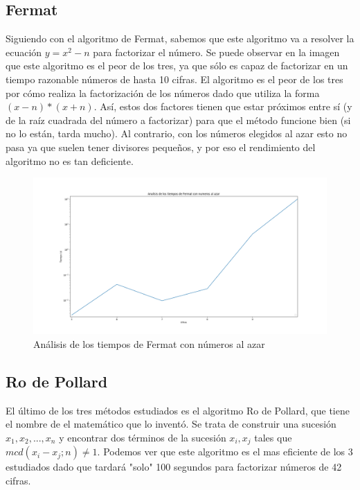 \documentclass{article}
\begin{document}
    \newpage

    \subsection{Fermat}
    Siguiendo con el algoritmo de Fermat, sabemos que este algoritmo va a resolver la ecuación \begin{math} y = x ^{2} - n \end{math} para factorizar el número. Se puede observar en la imagen que este algoritmo es el peor de los tres, ya que sólo es capaz de factorizar en un tiempo razonable números de hasta 10 cifras. El algoritmo es el peor de los tres por cómo realiza la factorización de los números dado que utiliza la forma \begin{math} (x-n)*(x+n)\end{math}. Así, estos dos factores tienen que estar próximos entre sí (y de la raíz cuadrada del número a factorizar) para que el método funcione bien (si no lo están, tarda mucho). Al contrario, con los números elegidos al azar esto no pasa ya que suelen tener divisores pequeños, y por eso el rendimiento del algoritmo no es tan deficiente.



    \begin{figure}[ht!]
        \centering
        \includegraphics[scale=0.3]{Figure_3}
        \caption{Análisis de los tiempos de Fermat con números al azar}
        \label{fig:Figure_3}
    \end{figure}

    \newpage

    \subsection{Ro de Pollard}
    El último de los tres métodos estudiados es el algoritmo Ro de Pollard, que tiene el nombre de el matemático que lo inventó. Se trata de construir una sucesión
    \begin{math} x_{1}, x_{2}, ..., x_{n} \end{math} y encontrar dos términos de la sucesión
    \begin{math}  x_{i}, x_{j} \end{math} tales que \begin{math} mcd(x_{i} - x_{j} ; n) \neq 1. \end{math} Podemos ver que este algoritmo es el mas eficiente de los 3 estudiados dado que tardará "solo" 100 segundos para factorizar números de 42 cifras.
\end{document}
